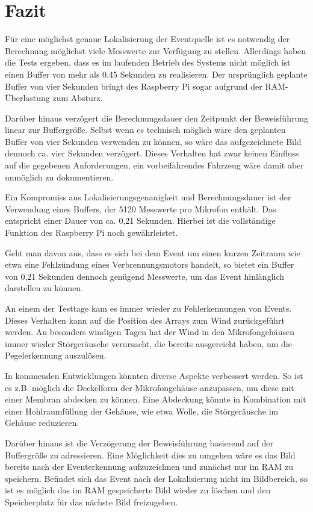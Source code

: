\section{Fazit}

Für eine möglichst genaue Lokalisierung der Eventquelle ist es notwendig der Berechnung möglichst viele Messwerte zur Verfügung zu stellen. Allerdings haben die Tests ergeben, dass es im laufenden Betrieb des Systems nicht möglich ist einen Buffer von mehr als 0.45 Sekunden zu realisieren. Der ursprünglich geplante Buffer von vier Sekunden bringt des Raspberry Pi sogar aufgrund der RAM-Überlastung zum Absturz.

Darüber hinaus verzögert die Berechnungsdauer den Zeitpunkt der Beweisführung linear zur Buffergröße. Selbst wenn es technisch möglich wäre den geplanten Buffer von vier Sekunden verwenden zu können, so wäre das aufgezeichnete Bild dennoch ca. vier Sekunden verzögert. Dieses Verhalten hat zwar keinen Einfluss auf die gegebenen Anforderungen, ein vorbeifahrendes Fahrzeug wäre damit aber unmöglich zu dokumentieren. 

Ein Kompromiss aus Lokalisierungsgenauigkeit und Berechnungsdauer ist der Verwendung eines Buffers, der 5120 Messwerte pro Mikrofon enthält. Das entspricht einer Dauer von ca. 0,21 Sekunden. Hierbei ist die vollständige Funktion des Raspberry Pi noch gewährleistet. 

Geht man davon aus, dass es sich bei dem Event um einen kurzen Zeitraum wie etwa eine Fehlzündung eines Verbrennungsmotors handelt, so bietet ein Buffer von 0,21 Sekunden dennoch genügend Messwerte, um das Event hinlänglich darstellen zu können. 

An einem der Testtage kam es immer wieder zu Fehlerkennungen von Events. Dieses Verhalten kann auf die Position des Arrays zum Wind zurückgeführt werden. An besonders windigen Tagen hat der Wind in den Mikrofongehäusen immer wieder Störgeräusche verursacht, die bereits ausgereicht haben, um die Pegelerkennung auszulösen. 

In kommenden Entwicklungen könnten diverse Aspekte verbessert werden. So ist es z.B. möglich die Deckelform der Mikrofongehäuse anzupassen, um diese mit einer Membran abdecken zu können. Eine Abdeckung könnte in Kombination mit einer Hohlraumfüllung der Gehäuse, wie etwa Wolle, die Störgeräusche im Gehäuse reduzieren. 

Darüber hinaus ist die Verzögerung der Beweisführung basierend auf der Buffergröße zu adressieren. Eine Möglichkeit dies zu umgehen wäre es das Bild bereits nach der Eventerkennung aufzuzeichnen und zunächst nur im RAM zu speichern. Befindet sich das Event nach der Lokalisierung nicht im Bildbereich, so ist es möglich das im RAM gespeicherte Bild wieder zu löschen und den Speicherplatz für das nächste Bild freizugeben. 

